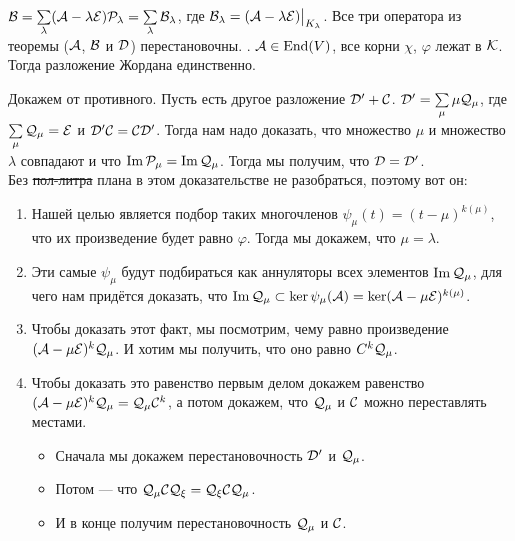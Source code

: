\documentclass{article}
\DeclareMathOperator{\operIm}{Im}
\let\Im\operIm
\newcommand{\id}{{\mathcal{E}}}
\begin{document}
\begin{itemize}
\begin{Proof}
        \end{Proof}
        \thm $\scriptB=\sum\limits_{\lambda}(\scriptA-\lambda\id)\scriptP_\lambda=\sum\limits_{\lambda}\scriptB_\lambda$, где $\scriptB_\lambda=(\scriptA-\lambda\id)\big|_{K_\lambda}$.
        \thm Все три оператора из теоремы (${\mathcal{A}}$, ${\mathcal{B}}$ и ${\mathcal{D}}$) перестановочны.
        \thm {}. ${\mathcal{A}}\in\operatorname{End}(V)$, все корни $\chi$, $\varphi$ лежат в ${\mathcal{K}}$. Тогда разложение Жордана единственно.
        \begin{Proof}
            Докажем от противного. Пусть есть другое разложение ${\mathcal{D}}'+{\mathcal{C}}$. ${\mathcal{D}}'=\sum\limits_{\mu}\mu{\mathcal{Q}}_\mu$, где $\sum\limits_{\mu}\scriptQ_\mu=\id$ и ${\mathcal{D}}'{\mathcal{C}}={\mathcal{C}}{\mathcal{D}}'$. Тогда нам надо доказать, что множество $\mu$ и множество $\lambda$ совпадают и что $\Im\scriptP_\mu=\Im\scriptQ_\mu$. Тогда мы получим, что ${\mathcal{D}}={\mathcal{D}}'$.\\
            Без \sout{пол-литра} плана в этом доказательстве не разобраться, поэтому вот он:
            \begin{enumerate}
                \item Нашей целью является подбор таких многочленов $\psi_\mu(t)=(t-\mu)^{k(\mu)}$, что их произведение будет равно $\varphi$. Тогда мы докажем, что $\mu=\lambda$.
                \item Эти самые $\psi_\mu$ будут подбираться как аннуляторы всех элементов $\Im\scriptQ_\mu$, для чего нам придётся доказать, что $\Im\scriptQ_\mu\subset\ker\psi_\mu(\scriptA)=\ker(\scriptA-\mu\id)^{k(\mu)}$.
                \item Чтобы доказать этот факт, мы посмотрим, чему равно произведение $(\scriptA-\mu\id)^k\scriptQ_\mu$. И хотим мы получить, что оно равно $C^k{\mathcal{Q}}_\mu$.
                \item Чтобы доказать это равенство первым делом докажем равенство $(\scriptA-\mu\id)^k\scriptQ_\mu=\scriptQ_\mu\scriptC^k$, а потом докажем, что ${\mathcal{Q}}_\mu$ и ${\mathcal{C}}$ можно переставлять местами.
                \begin{itemize}
                    \item Сначала мы докажем перестановочность ${\mathcal{D}}'$ и ${\mathcal{Q}}_\mu$.
                    \item Потом --- что ${\mathcal{Q}}_\mu{\mathcal{C}}{\mathcal{Q}}_\xi={\mathcal{Q}}_\xi{\mathcal{C}}{\mathcal{Q}}_\mu$.
                    \item И в конце получим перестановочность ${\mathcal{Q}}_\mu$ и ${\mathcal{C}}$.

\end{itemize}
\end{enumerate}
\end{Proof}
\end{itemize}
\end{document}
